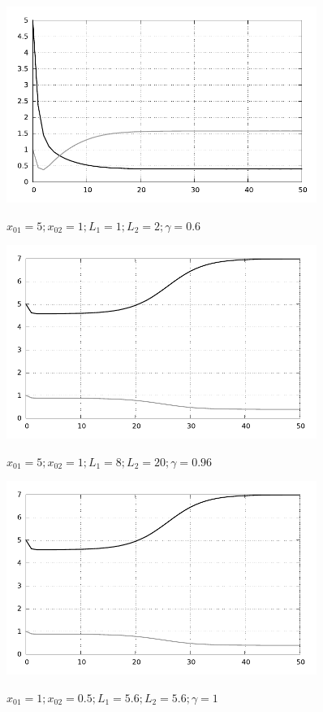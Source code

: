 \begin{figure}[h!]
    \center
    \includegraphics[width=0.9\textwidth]{images/graph_0007}
    \parbox{.8\textwidth}{ \centering
    \( x_{01} = 5; x_{02} = 1; L_1 = 1; L_2 = 2; \gamma = 0.6 \)}
    \includegraphics[width=0.9\textwidth]{images/graph_0008}
    \parbox{.8\textwidth}{ \centering
    \( x_{01} = 5; x_{02} = 1; L_1 = 8; L_2 = 20; \gamma = 0.96 \)}
\end{figure}
\begin{figure}[h!]
    \center
    \includegraphics[width=0.9\textwidth]{images/graph_0008}
    \parbox{.8\textwidth}{ \centering
    \( x_{01} = 1; x_{02} = 0.5; L_1 = 5.6; L_2 = 5.6; \gamma = 1 \)}
\end{figure}
